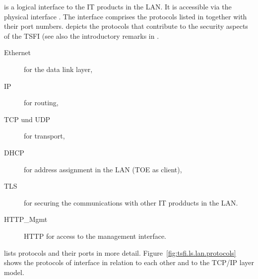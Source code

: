 


\lslan{} is a logical interface to the IT products in the LAN. It is accessible
via the physical interface . The interface comprises the protocols
listed in  together with their port
numbers.  depicts the protocols that
contribute to the security aspects of the TSFI (see also the introductory
remarks in .

\begin{description}
\item[Ethernet] for the data link layer,
\item[IP] for routing,	
\item[TCP und UDP] for transport,
\item[DHCP] for address assignment in the LAN (TOE as client),
\item[TLS] for securing the communications with other IT prodducts in the LAN.
\item[HTTP\_Mgmt] HTTP for access to the management interface.
\end{description}

 lists protocols and their ports in more
detail. Figure~\vref{fig:tsfi.ls.lan.protocols} shows the protocols of interface
\lslan{} in relation to each other and to the TCP/IP layer model.


